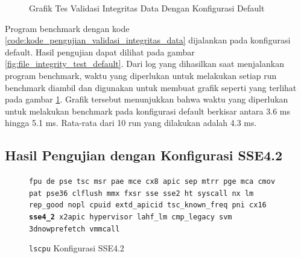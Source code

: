\begin{figure}
    \centering
    \caption{Grafik Tes Validasi Integritas Data Dengan Konfigurasi Default}
    \label{fig:file_integrity_test_default_graph}
\end{figure}

Program benchmark dengan kode \ref{code:kode_pengujian_validasi_integritas_data} dijalankan pada konfigurasi default. Hasil pengujian dapat dilihat pada gambar \ref{fig:file_integrity_test_default}. Dari log yang dihasilkan saat menjalankan program benchmark, waktu yang diperlukan untuk melakukan setiap run benchmark diambil dan digunakan untuk membuat grafik seperti yang terlihat pada gambar \ref{fig:file_integrity_test_default_graph}. Grafik tersebut menunjukkan bahwa waktu yang diperlukan untuk melakukan benchmark pada konfigurasi default berkisar antara 3.6 ms hingga 5.1 ms. Rata-rata dari 10 run yang dilakukan adalah 4.3 ms.

\subsection{Hasil Pengujian dengan Konfigurasi SSE4.2}
\begin{figure}
    \texttt{fpu de pse tsc msr pae mce cx8 apic sep mtrr pge mca cmov pat pse36 clflush mmx fxsr sse sse2 ht syscall nx lm rep\_good nopl cpuid extd\_apicid tsc\_known\_freq pni cx16 \textbf{sse4\_2} x2apic hypervisor lahf\_lm cmp\_legacy svm 3dnowprefetch vmmcall}
    \caption{\texttt{lscpu} Konfigurasi SSE4.2}
    \label{fig:lscpu_file_integrity_test_sse4.2}
\end{figure}

